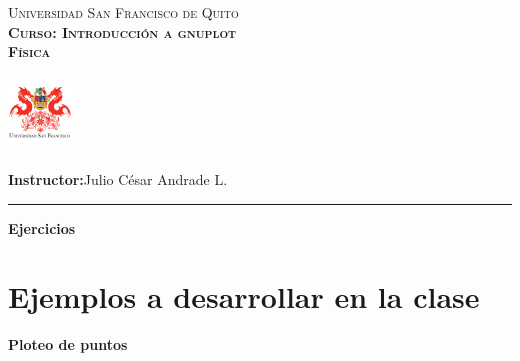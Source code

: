 \documentclass[11.5pt,a4paper]{article}
\begin{document}
\frenchspacing
\begin{center}
	\begin{minipage}{9.4cm}
		\begin{center}
				{\textsc{Universidad San Francisco de Quito}\\
						  \textsc{\textbf{Curso: Introducción a gnuplot}}\\
						  \textsc{\textbf{Física}} \\
                }
		\end{center}
	\end{minipage}
	    \begin{minipage}{1.8cm}
		\begin{center}
			\includegraphics[width=1.7cm, height=2.0cm]{logo.png}
		\end{center}
	\end{minipage}
\end{center}

\thispagestyle{empty}\bigskip
\setlength{\marginparwidth}{5cm}
\small \noindent \textbf{Instructor:}\hspace{0.3cm}Julio César Andrade L.\\

\thispagestyle{empty}\bigskip

\par\noindent\rule{\textwidth}{0.4pt}
\vspace{0.5cm}
\begin{center}
\textbf{\large Ejercicios} 
\end{center}
\vspace{0.5cm}

\section{Ejemplos a desarrollar en la clase}
\vspace{1.0cm}

\textbf{Ploteo de puntos}\\
\end{document}
